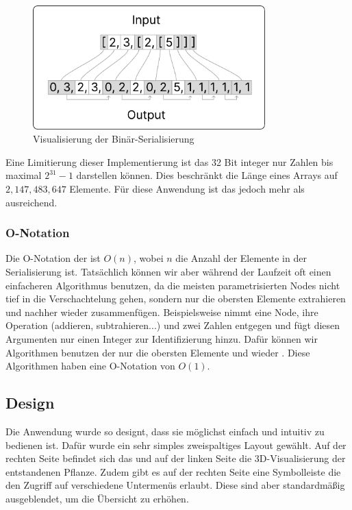 \documentclass[ngerman]{article}
\begin{document}
\begin{figure}[htbp]
  \centering
  \includegraphics[width=0.8\textwidth]{./graphics/ENCODING_SCHEME.pdf}
  \caption{Visualisierung der Binär-Serialisierung}
  \label{fig:encoding_scheme}
\end{figure}

Eine Limitierung dieser Implementierung ist das 32 Bit integer nur Zahlen bis maximal $2^{31}-1$ darstellen können. Dies beschränkt die Länge eines Arrays auf $2,147,483,647$ Elemente. Für diese Anwendung ist das jedoch mehr als ausreichend.

\subsubsection*{O-Notation}
Die O-Notation der  ist $O(n)$, wobei $n$ die Anzahl der Elemente in der Serialisierung ist. Tatsächlich können wir aber während der Laufzeit oft einen einfacheren Algorithmus benutzen, da die meisten parametrisierten Nodes nicht tief in die Verschachtelung gehen, sondern nur die obersten Elemente extrahieren und nachher wieder zusammenfügen. 
\br
Beispielsweise nimmt eine  Node, ihre Operation (addieren, subtrahieren...) und zwei Zahlen entgegen und fügt diesen Argumenten nur einen Integer zur Identifizierung hinzu. Dafür können wir Algorithmen benutzen der nur die obersten Elemente  und wieder .  Diese Algorithmen haben eine O-Notation von $O(1)$.


\subsection{Design}

Die Anwendung wurde so designt, dass sie möglichst einfach und intuitiv zu bedienen ist. Dafür wurde ein sehr simples zweispaltiges Layout gewählt. Auf der rechten Seite befindet sich das  und auf der linken Seite die 3D-Visualisierung der entstandenen Pflanze. Zudem gibt es auf der rechten Seite eine Symbolleiste die den Zugriff auf verschiedene Untermenüs erlaubt. Diese sind aber standardmäßig ausgeblendet, um die Übersicht zu erhöhen.
\end{document}
